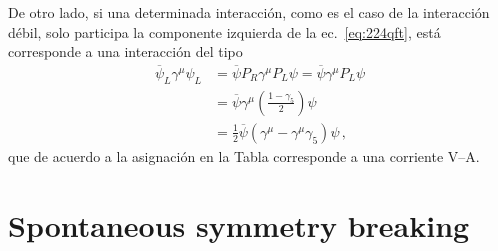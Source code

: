 De otro lado, si una determinada interacción, como es el caso de la interacción débil, solo participa la componente izquierda de la ec.~\eqref{eq:224qft}, está corresponde a una interacción del tipo
\begin{align}
  \overline{\psi}_L\gamma^\mu\psi_L&=\overline{\psi}P_R\gamma^\mu P_L\psi=\overline{\psi}\gamma^\mu P_L\psi\nonumber\\
  &=\overline{\psi}\gamma^\mu\left(\frac{1-\gamma_5}{2}\right)\psi\nonumber\\
  &=\tfrac{1}{2}\overline{\psi}\left(\gamma^\mu-\gamma^\mu\gamma_5\right)\psi\,,
\end{align}
que de acuerdo a la asignación en la Tabla corresponde a una corriente V--A. 

\section{Spontaneous symmetry breaking}
